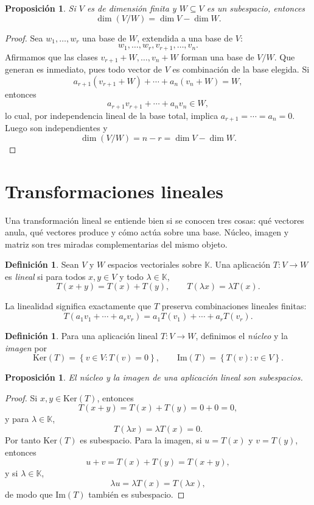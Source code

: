\documentclass[10pt,a4paper,oneside]{article}
\theoremstyle{plain}
\newtheorem{proposition}[theorem]{Proposición}
\theoremstyle{definition}
\newtheorem{definition}[theorem]{Definición}
\theoremstyle{remark}
\newcommand{\K}{\mathbb{K}}
\newcommand{\Ker}{\mathrm{Ker}}
\newcommand{\Ima}{\mathrm{Im}}
\newcommand{\set}[1]{\left\{ #1 \right\}}
\begin{document}
\begin{proposition}
Si \(V\) es de dimensión finita y \(W\subseteq V\) es un subespacio, entonces
\[
\dim(V/W)=\dim V-\dim W.
\]
\end{proposition}

\begin{proof}
Sea \(w_1,\dots,w_r\) una base de \(W\), extendida a una base de \(V\):
\[
w_1,\dots,w_r,v_{r+1},\dots,v_n.
\]
Afirmamos que las clases \(v_{r+1}+W,\dots,v_n+W\) forman una base de \(V/W\). Que generan es inmediato, pues todo vector de \(V\) es combinación de la base elegida. Si
\[
a_{r+1}(v_{r+1}+W)+\cdots+a_n(v_n+W)=W,
\]
entonces
\[
a_{r+1}v_{r+1}+\cdots+a_n v_n\in W,
\]
lo cual, por independencia lineal de la base total, implica \(a_{r+1}=\cdots=a_n=0\). Luego son independientes y
\[
\dim(V/W)=n-r=\dim V-\dim W.
\]
\end{proof}

\section{Transformaciones lineales}
\begin{summaryBox}
Una transformación lineal se entiende bien si se conocen tres cosas: qué vectores anula, qué vectores produce y cómo actúa sobre una base. Núcleo, imagen y matriz son tres miradas complementarias del mismo objeto.
\end{summaryBox}
\begin{definition}
Sean \(V\) y \(W\) espacios vectoriales sobre \(\K\). Una aplicación \(T:V\to W\) es \emph{lineal} si para todos \(x,y\in V\) y todo \(\lambda\in\K\),
\[
T(x+y)=T(x)+T(y),
\qquad
T(\lambda x)=\lambda T(x).
\]
\end{definition}

La linealidad significa exactamente que \(T\) preserva combinaciones lineales finitas:
\[
T(a_1v_1+\cdots+a_rv_r)=a_1T(v_1)+\cdots+a_rT(v_r).
\]

\begin{definition}
Para una aplicación lineal \(T:V\to W\), definimos el \emph{núcleo} y la \emph{imagen} por
\[
\Ker(T)=\set{v\in V:T(v)=0},
\qquad
\Ima(T)=\set{T(v):v\in V}.
\]
\end{definition}

\begin{proposition}
El núcleo y la imagen de una aplicación lineal son subespacios.
\end{proposition}

\begin{proof}
Si \(x,y\in\Ker(T)\), entonces
\[
T(x+y)=T(x)+T(y)=0+0=0,
\]
y para \(\lambda\in\K\),
\[
T(\lambda x)=\lambda T(x)=0.
\]
Por tanto \(\Ker(T)\) es subespacio. Para la imagen, si \(u=T(x)\) y \(v=T(y)\), entonces
\[
u+v=T(x)+T(y)=T(x+y),
\]
y si \(\lambda\in\K\),
\[
\lambda u=\lambda T(x)=T(\lambda x),
\]
de modo que \(\Ima(T)\) también es subespacio. \end{proof}
\end{document}

